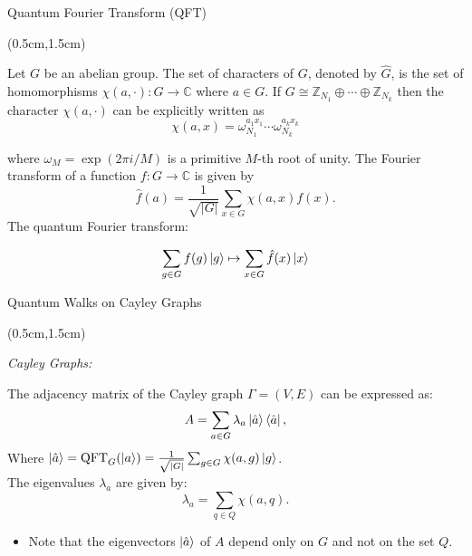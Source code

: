 \documentclass{beamer}
\theoremstyle{definition}
\begin{document}
\begin{frame}{Quantum Fourier Transform (QFT)}
    
    \begin{textblock*}{12cm}(0.5cm,1.5cm)

            
    Let $G$ be an abelian group. The set of characters of $G$, denoted by $\hat{G}$, is the set of homomorphisms $\chi(a, \cdot): G \to \mathbb{C}$ where $a \in G$. If $G \cong \mathbb{Z}_{N_1} \oplus \cdots \oplus \mathbb{Z}_{N_k}$ then the character $\chi(a, \cdot)$ can be explicitly written as
    \[ \chi(a, x) = \omega_{N_1}^{a_1x_1} \cdots \omega_{N_k}^{a_kx_k} \]
            
    where $\omega_M = \exp(2\pi i/ M)$ is a primitive $M$-th root of unity. The Fourier transform of a function $f: G \to \mathbb{C}$ is given by
    \[ \hat{f}(a) = \frac{1}{\sqrt{|G|}} \sum_{x \in G} \chi(a, x) f(x). \]
    The quantum Fourier transform:
    
    \[
        \sum_{g \in G} f(g) \ket{g} \mapsto \sum_{x \in G} \hat{f}(x)\ket{x}
    \]
   


       
    \end{textblock*}


\end{frame}







\begin{frame}{Quantum Walks on Cayley Graphs}
    
    \begin{textblock*}{12cm}(0.5cm,1.5cm)
        
        \textit{Cayley Graphs:} \\
        \vspace{0.3cm}
        
        The adjacency matrix of the Cayley graph $\Gamma = (V,E)$ can be expressed as:
        \[ A = \sum_{a \in G} \lambda_a \ket{\hat{a}} \bra{\hat{a}}, \]
        Where $\ket{\hat{a}} = \operatorname{QFT}_G(\ket{a}) =  \frac{1}{\sqrt{|G|}}\sum_{g \in G}\chi(a,g)\ket{g}$. \\
        The eigenvalues $\lambda_a$ are given by:
        \[ \lambda_a = \sum_{q \in Q} \chi(a, q). \]
        \begin{itemize}
            \item  Note that the eigenvectors $\ket{\hat{a}}$ of $A$ depend only on $G$ and not on the set $Q$.
        \end{itemize}
    
    \end{textblock*}


\end{frame}
\end{document}
